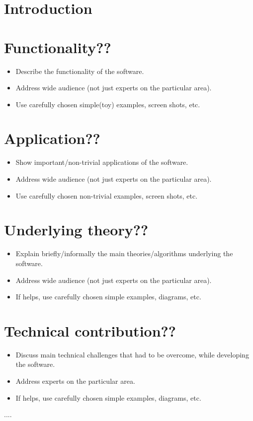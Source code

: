 \documentclass[runningheads,a4paper]{llncs}
\begin{document}
\section{Introduction}

\section{Functionality??}
\begin{itemize}
\item Describe the functionality of the software.
\item Address  wide audience (not just experts on the particular area).
\item Use carefully chosen  simple(toy) examples, screen shots, etc.
\end{itemize}
  
\section{Application??}
\begin{itemize}
\item Show important/non-trivial applications of the software.
\item Address wide audience (not just experts on the particular area).
\item Use carefully chosen  non-trivial  examples, screen shots, etc.
\end{itemize}

\section{Underlying theory??}
\begin{itemize}
\item Explain briefly/informally the main theories/algorithms underlying the software.
\item Address wide audience (not just experts on the particular area).
\item If helps, use carefully chosen  simple  examples, diagrams, etc.
\end{itemize}

\section{Technical contribution??}
\begin{itemize}
\item Discuss main technical challenges that had to be overcome, 
      while developing the software.
\item Address experts on the particular area.
\item If helps, use carefully chosen  simple  examples, diagrams, etc.
\end{itemize}

\begin{thebibliography}{4}
 .... 
\end{thebibliography}
\end{document}
